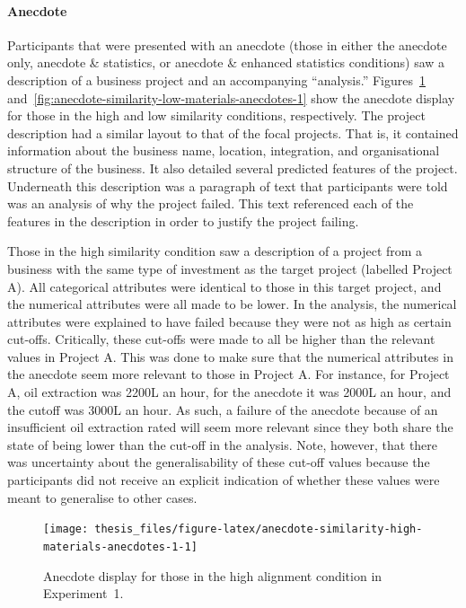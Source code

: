 \documentclass[a4paper, nobind, dvipsnames]{templates/ociamthesis}
\theoremstyle{definition}
\theoremstyle{definition}
\theoremstyle{definition}
\theoremstyle{definition}
\theoremstyle{remark}
\begin{document}
\paragraph{Anecdote}

Participants that were presented with an anecdote (those in either the anecdote
only, anecdote \& statistics, or anecdote \& enhanced statistics conditions) saw a
description of a business project and an accompanying ``analysis.''
Figures~\ref{fig:anecdote-similarity-high-materials-anecdotes-1}
and~\ref{fig:anecdote-similarity-low-materials-anecdotes-1} show the anecdote
display for those in the high and low similarity conditions, respectively. The
project description had a similar layout to that of the focal projects. That is,
it contained information about the business name, location, integration, and
organisational structure of the business. It also detailed several predicted
features of the project. Underneath this description was a paragraph of text
that participants were told was an analysis of why the project failed. This text
referenced each of the features in the description in order to justify the
project failing.

Those in the high similarity condition saw a description of a project from a
business with the same type of investment as the target project (labelled
Project A). All categorical attributes were identical to those in this target
project, and the numerical attributes were all made to be lower. In the
analysis, the numerical attributes were explained to have failed because they
were not as high as certain cut-offs. Critically, these cut-offs were made to
all be higher than the relevant values in Project A. This was done to make sure
that the numerical attributes in the anecdote seem more relevant to those in
Project A. For instance, for Project A, oil extraction was 2200L an hour, for
the anecdote it was 2000L an hour, and the cutoff was 3000L an hour. As such, a
failure of the anecdote because of an insufficient oil extraction rated will
seem more relevant since they both share the state of being lower than the
cut-off in the analysis. Note, however, that there was uncertainty about the
generalisability of these cut-off values because the participants did not
receive an explicit indication of whether these values were meant to generalise
to other cases.



\begin{figure}
\texttt{[image: thesis\_files/figure-latex/anecdote-similarity-high-materials-anecdotes-1-1]} \caption{Anecdote display for those in the high alignment condition in Experiment~1.}\label{fig:anecdote-similarity-high-materials-anecdotes-1}
\end{figure}
\end{document}
